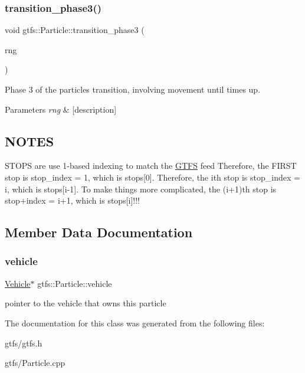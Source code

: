 \subsubsection{\texorpdfstring{transition\+\_\+phase3()}{transition\_phase3()}}
{\footnotesize\ttfamily void gtfs\+::\+Particle\+::transition\+\_\+phase3 (\begin{DoxyParamCaption}\item[{\hyperlink{classsampling_1_1RNG}{sampling\+::\+R\+NG} \&}]{rng }\end{DoxyParamCaption})}

Phase 3 of the particle\textquotesingle{}s transition, involving movement until time\textquotesingle{}s up.


\begin{DoxyParams}{Parameters}
{\em rng} & \mbox{[}description\mbox{]} \\
\hline
\end{DoxyParams}
\subsection*{N\+O\+T\+ES}

S\+T\+O\+PS are use 1-\/based indexing to match the \hyperlink{classgtfs_1_1GTFS}{G\+T\+FS} feed Therefore, the F\+I\+R\+ST stop is stop\+\_\+index = 1, which is stops\mbox{[}0\mbox{]}. Therefore, the ith stop is stop\+\_\+index = i, which is stops\mbox{[}i-\/1\mbox{]}. To make things more complicated, the (i+1)th stop is stop+index = i+1, which is stops\mbox{[}i\mbox{]}!!!

\subsection{Member Data Documentation}
\mbox{\label{classgtfs_1_1Particle_a81c313d505ecb592d79463f167dfb76c}} 
\subsubsection{\texorpdfstring{vehicle}{vehicle}}
{\footnotesize\ttfamily \hyperlink{classgtfs_1_1Vehicle}{Vehicle}$\ast$ gtfs\+::\+Particle\+::vehicle}

pointer to the vehicle that owns this particle 

The documentation for this class was generated from the following files\+:\begin{DoxyCompactItemize}
\item 
gtfs/gtfs.\+h\item 
gtfs/Particle.\+cpp\end{DoxyCompactItemize}

